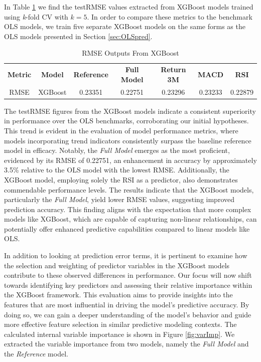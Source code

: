 In Table \ref{tab:RMSExgb} we find the testRMSE values extracted from XGBoost models trained using \textit{k}-fold CV with \(k = 5\). In order to compare these metrics to the benchmark OLS models, we train five separate XGBoost models on the same forms as the OLS models presented in Section \ref{sec:OLSpred}. 
\begin{table}[H]
\caption{RMSE Outputs From XGBoost} 
\label{tab:RMSExgb}
\centering
\small
\begin{tabular*}{\textwidth}{@{\extracolsep{\fill}}ccccccc@{}}
  \toprule
\textbf{Metric} & \textbf{Model} & \textbf{Reference} & \textbf{Full Model} & \textbf{Return 3M} & \textbf{MACD} & \textbf{RSI} \\ 
RMSE & XGBoost & 0.23351 & 0.22751 & 0.23296 & 0.23233 & 0.22879 \\  
   \bottomrule
\end{tabular*}
\end{table}
The testRMSE figures from the XGBoost models indicate a consistent superiority in performance over the OLS benchmarks, corroborating our initial hypotheses. This trend is evident in the evaluation of model performance metrics, where models incorporating trend indicators consistently surpass the baseline reference model in efficacy. Notably, the \textit{Full Model} emerges as the most proficient, evidenced by its RMSE of 0.22751, an enhancement in accuracy by approximately 3.5\% relative to the OLS model with the lowest RMSE. Additionally, the XGBoost model, employing solely the RSI as a predictor, also demonstrates commendable performance levels. The results indicate that the XGBoost models, particularly the \textit{Full Model}, yield lower RMSE values, suggesting improved prediction accuracy. This finding aligns with the expectation that more complex models like XGBoost, which are capable of capturing non-linear relationships, can potentially offer enhanced predictive capabilities compared to linear models like OLS.

In addition to looking at prediction error terms, it is pertinent to examine how the selection and weighting of predictor variables in the XGBoost models contribute to these observed differences in performance. Our focus will now shift towards identifying key predictors and assessing their relative importance within the XGBoost framework. This evaluation aims to provide insights into the features that are most influential in driving the model's predictive accuracy. By doing so, we can gain a deeper understanding of the model's behavior and guide more effective feature selection in similar predictive modeling contexts. The calculated internal variable importance is shown in Figure \ref{fig:varImp}. We extracted the variable importance from two models, namely the \textit{Full Model} and the \textit{Reference} model.

